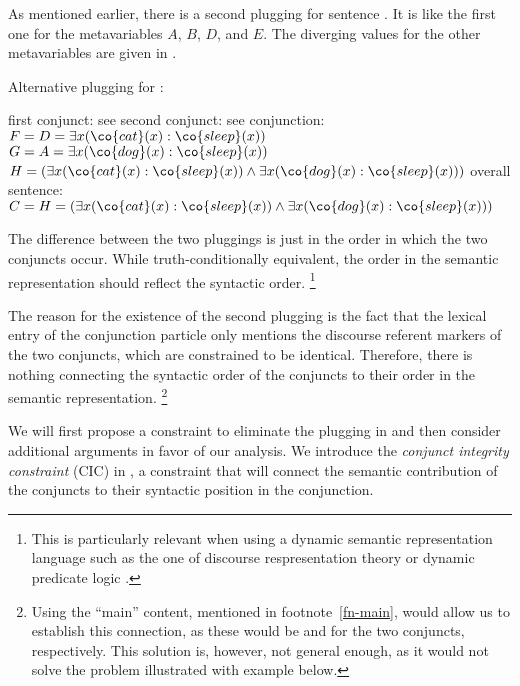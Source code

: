 \documentclass[output=paper]{langsci/langscibook}
\begin{document}
As mentioned earlier, there is a second plugging for sentence . It is like the first one for the metavariables $A$, $B$, $D$, and $E$. The diverging values for the other metavariables are given in .

\ea 
Alternative plugging for : \label{hund-katze-schlaf-plug2}
\begin{xlist}
\ex first conjunct: see 
\ex second conjunct: see 
\ex conjunction:\\
$F = D = \exists x (\co{cat}(x) : \co{sleep}(x))$\\
$G = A = \exists x (\co{dog}(x) : \co{sleep}(x))$\\
$H = (\exists x (\co{cat}(x) : \co{sleep}(x)) \land \exists x (\co{dog}(x) : \co{sleep}(x)))$
\ex overall sentence:\\
$C = H = (\exists x (\co{cat}(x) : \co{sleep}(x)) \land \exists x (\co{dog}(x) : \co{sleep}(x)))$
\end{xlist}
\z

The difference between the two pluggings is just in the order in which the two conjuncts occur. While truth-conditionally equivalent, the order in the semantic representation should reflect the syntactic order.%
\footnote{This is particularly relevant when using a dynamic semantic representation language such as the one of discourse respresentation theory \citep{Kamp:Reyle:93} or dynamic predicate logic \citep{Groenendijk:Stokhof:91}.}

The reason for the existence of the second plugging is the fact that the lexical entry of the conjunction particle only mentions the discourse referent markers of the two conjuncts, which are constrained to be identical. Therefore, there is nothing connecting the syntactic order of the conjuncts to their order in the semantic representation.%
\footnote{Using the ``main'' content, mentioned in footnote~\ref{fn-main}, would allow us to establish this connection, as these would be  and  for the two conjuncts, respectively. This solution is, however, not general enough, as it would not solve the problem illustrated with example  below.}

We will first propose a constraint to eliminate the plugging in 
 and then consider additional arguments in favor of our analysis. 
We introduce the \emph{conjunct integrity constraint} (CIC)
in , a constraint that will connect the semantic contribution of the conjuncts to their syntactic position in the conjunction.
\end{document}
